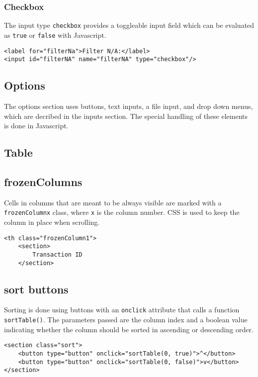 \documentclass[letterpaper]{article}
\begin{document}
\subsubsection{Checkbox}

The input type \lstinline{checkbox} provides a toggleable input field which can be evaluated as \lstinline{true} or \lstinline{false} with Javascript.
\begin{lstlisting}[firstnumber=153]
<label for="filterNa">Filter N/A:</label>
<input id="filterNA" name="filterNA" type="checkbox"/>
\end{lstlisting}

\subsection{Options}

The options section uses buttons, text inputs, a file input, and drop down menus, which are decribed in the inputs section.
The special handling of these elements is done in Javascript.

\subsection{Table}

\subsection{frozenColumns}

Cells in columns that are meant to be always visible are marked with a \lstinline{frozenColumnx} class, where \lstinline{x} is the column number.
CSS is used to keep the column in place when scrolling.
\begin{lstlisting}[firstnumber=233]
<th class="frozenColumn1">
    <section>
        Transaction ID
    </section>
\end{lstlisting}

\subsection{sort buttons}

Sorting is done using buttons with an \lstinline{onclick} attribute that calls a function \lstinline{sortTable()}.
The parameters passed are the column index and a boolean value indicating whether the column should be sorted in ascending or descending order.
\begin{lstlisting}[firstnumber=237]
<section class="sort">
    <button type="button" onclick="sortTable(0, true)">^</button>
    <button type="button" onclick="sortTable(0, false)">v</button>
</section>
\end{lstlisting}
\end{document}
